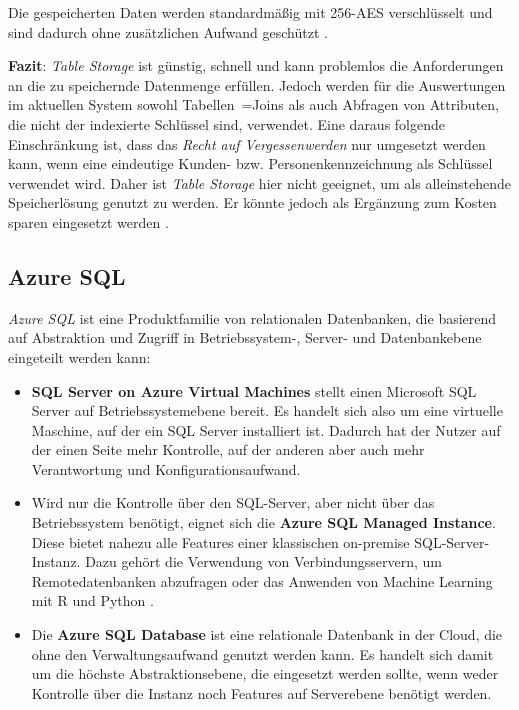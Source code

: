 Die gespeicherten Daten werden standardmäßig mit 256-AES verschlüsselt und sind dadurch ohne zusätzlichen Aufwand geschützt \cite{soh_microsoft_2020}.

\textbf{Fazit}: \textit{Table Storage} ist günstig, schnell und kann problemlos die Anforderungen an die zu speichernde Datenmenge erfüllen. Jedoch werden für die Auswertungen im aktuellen System sowohl Tabellen~=Joins als auch Abfragen von Attributen, die nicht der indexierte Schlüssel sind, verwendet. Eine daraus folgende Einschränkung ist, dass das \textit{Recht auf Vergessenwerden} nur umgesetzt werden kann, wenn eine eindeutige Kunden- bzw. Personenkennzeichnung als Schlüssel verwendet wird. Daher ist \textit{Table Storage} hier nicht geeignet, um als alleinstehende Speicherlösung genutzt zu werden. Er könnte jedoch als Ergänzung zum Kosten sparen eingesetzt werden \cite[vgl.][]{reagan_web_2018}. 


\subsection{Azure SQL} \label{sec:grundlagen:azure_dienste:sql}
\textit{Azure SQL} ist eine Produktfamilie von relationalen Datenbanken, die basierend auf Abstraktion und Zugriff in Betriebssystem-, Server- und Datenbankebene eingeteilt werden kann\cite{mauri_azure_2021}:

\begin{itemize}
\item \textbf{SQL Server on Azure Virtual Machines} stellt einen Microsoft SQL Server auf Betriebssystemebene bereit. Es handelt sich also um eine virtuelle Maschine, auf der ein SQL Server installiert ist. Dadurch hat der Nutzer auf der einen Seite mehr Kontrolle, auf der anderen aber auch mehr Verantwortung und Konfigurationsaufwand. 
\item Wird nur die Kontrolle über den SQL-Server, aber nicht über das Betriebssystem benötigt, eignet sich die \textbf{Azure SQL Managed Instance}. Diese bietet nahezu alle Features einer klassischen on-premise SQL-Server-Instanz. Dazu gehört die Verwendung von Verbindungsservern, um Remotedatenbanken abzufragen \cite{msdoc_21_sqlMI_tsql} oder das Anwenden von Machine Learning mit R und Python \cite{msdoc_21_sqlMachineLearningServices}.
\item Die \textbf{Azure SQL Database} ist eine relationale Datenbank in der Cloud, die ohne den Verwaltungsaufwand genutzt werden kann. Es handelt sich damit um die höchste Abstraktionsebene, die eingesetzt werden sollte, wenn weder Kontrolle über die Instanz noch Features auf Serverebene benötigt werden.
\end{itemize}

